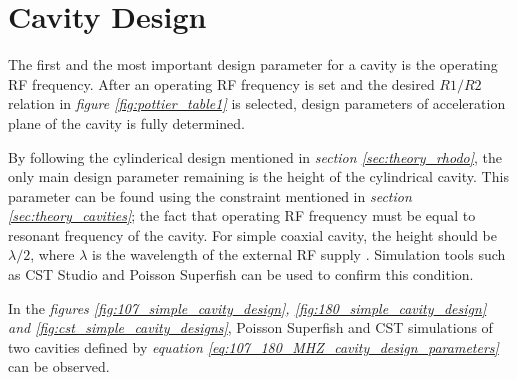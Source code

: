 \documentclass{article}
\begin{document}
\newcommand{\vecthreeBF}[1]{\vec{\textbf{#1}}}
\newcommand{\vecthree}[1]{\vec{#1}}

\newcommand{\parDeriv}[2]{\frac{\partial #1}{\partial #2}}
\newcommand{\parDerivS}[2]{\frac{\partial^2 #1}{\partial #2^2}}
\newcommand{\derivS}[2]{\frac{d^2 #1}{d#2^2}}

\newcommand{\dotProdBF}[2]{\vecthreeBF{#1} \cdot \vecthreeBF{#2}}
\newcommand{\dotProd}[2]{\vecthree{#1} \cdot \vecthree{#2}}

\newcommand{\crossProdBF}[2]{\vecthreeBF{#1} \times \vecthreeBF{#2}}
\newcommand{\crossProd}[2]{\vecthree{#1} \times \vecthree{#2}}


\newcommand{\fromeq}[1]{\textit{equation \ref{eq:#1}}}
\newcommand{\fromeqs}[2]{\textit{equations \ref{eq:#1} and \ref{eq:#2}}}

\newcommand{\fromfig}[1]{\textit{figure \ref{fig:#1}}}
\newcommand{\fromfigs}[2]{\textit{figures \ref{fig:#1} and \ref{fig:#2}}}
\newcommand{\fromfigth}[3]{\textit{figures \ref{fig:#1}, \ref{fig:#2} and \ref{fig:#3}}}
\newcommand{\fromsec}[1]{\textit{section \ref{sec:#1}}}

\newcommand{\comment}[1]{}



\section{Cavity Design} \label{sec:cavity_design}

The first and the most important design parameter for a cavity is the operating RF frequency.
After an operating RF frequency is set and the desired $R1/R2$ relation in \fromfig{pottier_table1} is selected, design parameters of acceleration plane of the cavity is fully determined.

By following the cylinderical design mentioned in \fromsec{theory_rhodo}, the only main design parameter remaining is the height of the cylindrical cavity.
This parameter can be found using the constraint mentioned in \fromsec{theory_cavities}; the fact that operating RF frequency must be equal to resonant frequency of the cavity.
For simple coaxial cavity, the height should be $\lambda/2$, where $\lambda$ is the wavelength of the external RF supply \cite{rhodo_pottier}.
Simulation tools such as CST Studio and Poisson Superfish can be used to confirm this condition.

In the \fromfigth{107_simple_cavity_design}{180_simple_cavity_design}{cst_simple_cavity_designs}, 
Poisson Superfish and CST simulations of two cavities defined by \fromeq{107_180_MHZ_cavity_design_parameters} can be observed.
\end{document}
